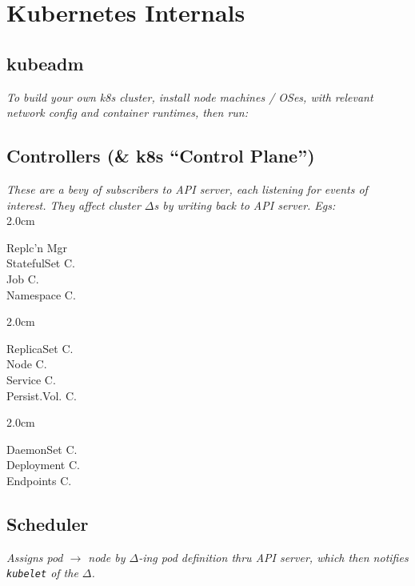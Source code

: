 \section{Kubernetes Internals}



\subsection*{kubeadm}

{\footnotesize \textit{To build your own k8s cluster, install node machines / OSes, with relevant network config and container runtimes, then run:}}\\



\subsection*{Controllers (\& k8s ``Control Plane'')}
{\footnotesize \textit{These are a bevy of subscribers to API server, each listening for events of interest. They affect cluster $\Delta$s by writing back to API server. Egs:}}\\[-2mm]
\api
{2.0cm}{
Replc'n Mgr     \\
StatefulSet C.  \\
Job C.          \\
Namespace C.    

}
{2.0cm}{
ReplicaSet C.   \\
Node C.         \\
Service C.      \\
Persist.Vol. C. 

}
{2.0cm}{
DaemonSet C.    \\
Deployment C.   \\
Endpoints C.    

}
\stopapi



\subsection*{Scheduler}
{\footnotesize \textit{Assigns pod $\to$ node by $\Delta$-ing pod definition thru API server, which then notifies {\tt kubelet} of the $\Delta$.}}



